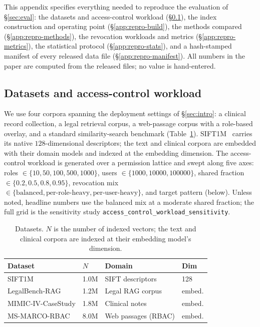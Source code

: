 \documentclass[sigconf, nonacm, review]{acmart}
\begin{document}
This appendix specifies everything needed to reproduce the evaluation of
\S\ref{sec:eval}: the datasets and access-control workload
(\S\ref{app:repro-data}), the index construction and operating point
(\S\ref{app:repro-build}), the methods compared (\S\ref{app:repro-methods}),
the revocation workloads and metrics (\S\ref{app:repro-metrics}), the
statistical protocol (\S\ref{app:repro-stats}), and a hash-stamped manifest of
every released data file (\S\ref{app:repro-manifest}). All numbers in the paper
are computed from the released files; no value is hand-entered.

\subsection{Datasets and access-control workload}
\label{app:repro-data}
We use four corpora spanning the deployment settings of \S\ref{sec:intro}:
a clinical record collection, a legal retrieval corpus, a web-passage corpus
with a role-based overlay, and a standard similarity-search benchmark
(Table~\ref{tab:datasets}). SIFT1M~\cite{DBLP:journals/pami/JegouDS11} carries
its native $128$-dimensional descriptors; the text and clinical corpora are
embedded with their domain models and indexed at the embedding dimension. The
access-control workload is generated over a permission lattice and swept along
five axes: roles $\in\{10,50,100,500,1000\}$, users
$\in\{1000,10000,100000\}$, shared fraction $\in\{0.2,0.5,0.8,0.95\}$,
revocation mix $\in\{\text{balanced},\text{per-role-heavy},\text{per-user-heavy}\}$,
and target pattern (below). Unless noted, headline numbers use the balanced mix
at a moderate shared fraction; the full grid is the sensitivity study
\texttt{access\_control\_workload\_sensitivity}.

\begin{table}[t]
\centering
\caption{Datasets. $N$ is the number of indexed vectors; the text and clinical
corpora are indexed at their embedding model's dimension.}
\label{tab:datasets}
\small
\begin{tabular}{@{}llll@{}}
\toprule
Dataset & $N$ & Domain & Dim \\
\midrule
SIFT1M & 1.0M & SIFT descriptors & 128 \\
LegalBench-RAG & 1.2M & Legal RAG corpus & embed. \\
MIMIC-IV-CaseStudy & 1.8M & Clinical notes & embed. \\
MS-MARCO-RBAC & 8.0M & Web passages (RBAC) & embed. \\
\bottomrule
\end{tabular}
\end{table}
\end{document}
